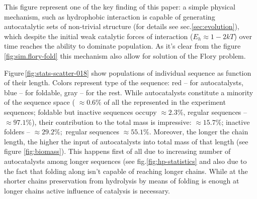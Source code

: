 \documentclass[journal=jacsat,manuscript=article,layout=twocolumn]{achemso}
\begin{document}
This figure represent one of the key finding of this paper: a simple physical mechanism, such as 
hydrophobic interaction is capable of generating autocatalytic sets of non-trivial structure (for 
details see sec.\ref{sec:evolution}), which despite the initial weak catalytic forces of 
interaction ($E_h\approx 1-2kT$) over time reaches the ability to dominate population. As it's 
clear from the figure \ref{fig:sim.flory-fold} this mechanism also allow for solution of the Flory 
problem.

Figure\,\ref{fig:stats-scatter-018} show populations of individual sequence as function of their 
length. Colors represent type of the sequence: red -- for autocatalysts, blue -- for foldable, gray 
-- for the rest. While autocatalysts constitute a minority of the sequence space ( $\approx 0.6\%$ 
of all the represented in the experiment sequences; foldable but inactive sequences occupy $\approx 
2.3\%$, regular sequences -- $\approx97.1\%$), their contribution to the total mass is impressive: 
$\approx 15.7\%$; inactive folders -- $\approx 29.2\%;$ regular sequences $\approx 55.1\%$. 
Moreover, the longer the chain length, the higher the input of autocatalysts into total mass of 
that length (see figure \ref{fig:biomass}). This happens first of all due to increasing number of 
autocatalysts among longer sequences (see fig.\ref{fig:hp-statistics} and also due to the fact that 
folding along isn't capable of reaching longer chains. While at the shorter chains preservation 
from hydrolysis by means of folding is enough at longer chains active influence of catalysis is 
necessary.
\end{document}
